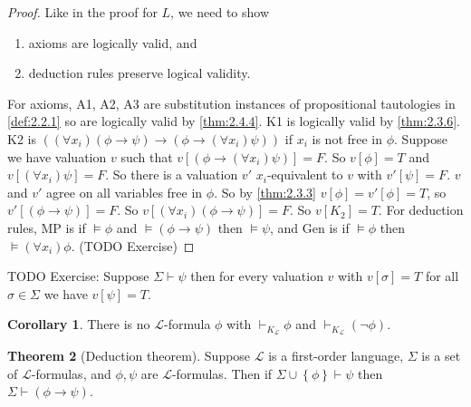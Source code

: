 \documentclass{article}
\newcommand{\rb}[1]{\left( #1 \right)}
\renewcommand{\sb}[1]{\left[ #1 \right]}
\newcommand{\cb}[1]{\left\{ #1 \right\}}
\newcommand{\notb}[1]{\rb{\neg #1}}
\newcommand{\impb}[2]{\rb{#1 \rightarrow #2}}
\newcommand{\fab}[1]{\rb{\forall #1}}
\theoremstyle{definition}\newtheorem{definition}{Definition}[subsection]
\theoremstyle{definition}\newtheorem{remark}[definition]{Remark}
\theoremstyle{definition}\newtheorem*{example}{Example}
\theoremstyle{definition}\newtheorem*{note}{Note}
\newtheorem{theorem}[definition]{Theorem}
\newtheorem{corollary}[definition]{Corollary}
\begin{document}
\begin{proof}
Like in the proof for $ L $, we need to show
\begin{enumerate}
\item axioms are logically valid, and
\item deduction rules preserve logical validity.
\end{enumerate}
For axioms, A1, A2, A3 are substitution instances of propositional tautologies in \ref{def:2.2.1} so are logically valid by \ref{thm:2.4.4}. K1 is logically valid by \ref{thm:2.3.6}. K2 is $ \impb{\fab{x_i}\impb{\phi}{\psi}}{\impb{\phi}{\fab{x_i}\psi}} $ if $ x_i $ is not free in $ \phi $. Suppose we have valuation $ v $ such that $ v\sb{\impb{\phi}{\fab{x_i}\psi}} = F $. So $ v\sb{\phi} = T $ and $ v\sb{\fab{x_i}\psi} = F $. So there is a valuation $ v' $ $ x_i $-equivalent to $ v $ with $ v'\sb{\psi} = F $. $ v $ and $ v' $ agree on all variables free in $ \phi $. So by \ref{thm:2.3.3} $ v\sb{\phi} = v'\sb{\phi} = T $, so $ v'\sb{\impb{\phi}{\psi}} = F $. So $ v\sb{\fab{x_i}\impb{\phi}{\psi}} = F $. So $ v\sb{K_2} = T $. For deduction rules, MP is if $ \vDash \phi $ and $ \vDash \impb{\phi}{\psi} $ then $ \vDash \psi $, and Gen is if $ \vDash \phi $ then $ \vDash \fab{x_i}\phi $. (TODO Exercise)
\end{proof}

TODO Exercise: Suppose $ \Sigma \vdash \psi $ then for every valuation $ v $ with $ v\sb{\sigma} = T $ for all $ \sigma \in \Sigma $ we have $ v\sb{\psi} = T $.

\begin{corollary}
There is no $ \mathcal{L} $-formula $ \phi $ with $ \vdash_{K_\mathcal{L}} \phi $ and $ \vdash_{K_\mathcal{L}} \notb{\phi} $.
\end{corollary}

\begin{theorem}[Deduction theorem]
Suppose $ \mathcal{L} $ is a first-order language, $ \Sigma $ is a set of $ \mathcal{L} $-formulas, and $ \phi, \psi $ are $ \mathcal{L} $-formulas. Then if $ \Sigma \cup \cb{\phi} \vdash \psi $ then $ \Sigma \vdash \impb{\phi}{\psi} $.
\end{theorem}
\end{document}
